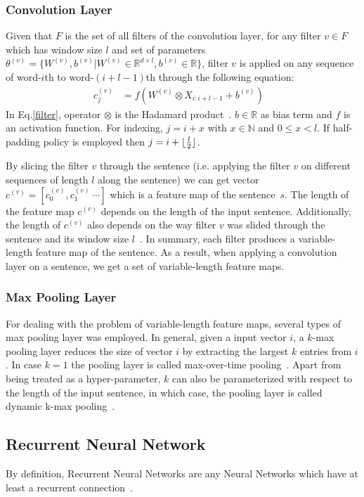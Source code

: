 \subsubsection{Convolution Layer}
Given that \(F\) is the set of all filters of the convolution layer, for any filter \(v \in F\) which has window size \(l\) and set of parameters \(\theta^{(v)} = \{ W^{(v)}, b^{(v)} | W^{(v)} \in \mathbb{R}^{d \times l}, b^{(v)} \in \mathbb{R}\}\), filter \({v}\) is applied on any sequence of word-\(i\)th to word-\((i+l-1)\)th through the following equation:
\begin{align}
c^{(v)}_j &= f(W^{(v)} \otimes X_{i:i+l-1} + b^{(v)}) &\label{filter}
\end{align}
In Eq.\eqref{filter}, operator \(\otimes\) is the Hadamard product~\cite{element-prod}.  
\(b \in \mathbb{R}\) as bias term and \(f\) is an activation function.
For indexing, \(j = i + x\) with \(x \in \mathbb{N}\) and \(0 \leq x < l\).
If half-padding policy is employed then \(j = i + \lfloor \frac{l}{2} \rfloor\).

By slicing the filter \(v\) through the sentence (i.e. applying the filter \(v\) on different sequences of length \(l\) along the sentence) we can get vector \(c^{(v)} = [c^{(v)}_0, c^{(v)}_1~\cdots]\) which is a feature map of the sentence~\(s\).
The length of the feature map \(c^{(v)}\) depends on the length of the input sentence.
Additionally, the length of \(c^{(v)}\) also depends on the way filter \(v\) was slided through the sentence and its window size \(l\)~\cite{conv-arith}.
In summary, each filter produces a variable-length feature map of the sentence.
As a result, when applying a convolution layer on a sentence, we get a set of variable-length feature maps.
\subsubsection{Max Pooling Layer}
For dealing with the problem of variable-length feature maps, several types of max pooling layer was employed.
In general, given a input vector \(i\), a \(k\)-max pooling layer reduces the size of vector \(i\) by extracting the largest \(k\) entries from \(i\).
In case \(k = 1\) the pooling layer is called max-over-time pooling~\cite{nlp-scratch,KimCNN}.
Apart from being treated as a hyper-parameter, \(k\) can also be parameterized with respect to the length of the input sentence, in which case, the pooling layer is called dynamic k-max pooling~\cite{DCNN}.
\subsection{Recurrent Neural Network}
By definition, Recurrent Neural Networks are any Neural Networks which have at least a recurrent connection~\cite{rnn-def}.
